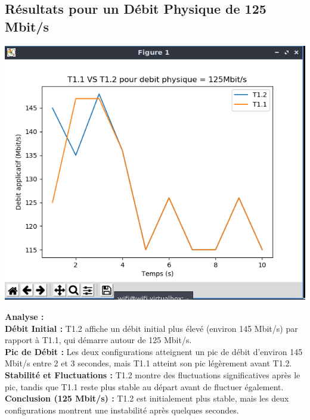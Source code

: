 \subsection{Résultats pour un Débit Physique de 125 Mbit/s}
\begin{center}
    \includegraphics[width=1\textwidth]{./images/T1vsT2pour125.png}
\end{center}
\textbf{Analyse :}\\
\textbf{Débit Initial :} T1.2 affiche un débit initial plus élevé (environ 145 Mbit/s) par rapport à T1.1, qui démarre autour de 125 Mbit/s.\\
\textbf{Pic de Débit :} Les deux configurations atteignent un pic de débit d'environ 145 Mbit/s entre 2 et 3 secondes, mais T1.1 atteint son pic légèrement avant T1.2.\\
\textbf{Stabilité et Fluctuations :} T1.2 montre des fluctuations significatives après le pic, tandis que T1.1 reste plus stable au départ avant de fluctuer également.\\
\textbf{Conclusion (125 Mbit/s) :} T1.2 est initialement plus stable, mais les deux configurations montrent une instabilité après quelques secondes.

